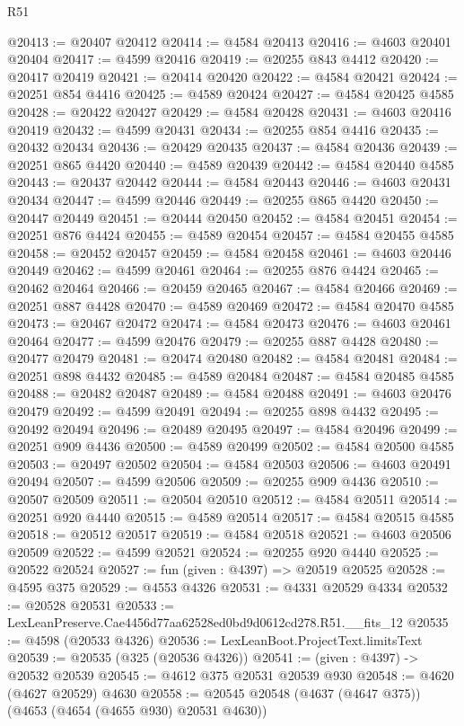 \begin{lexlean}{R51}
\begin{coremodule}
@20413 := @20407 @20412
@20414 := @4584 @20413
@20416 := @4603 @20401 @20404
@20417 := @4599 @20416
@20419 := @20255 @843 @4412
@20420 := @20417 @20419
@20421 := @20414 @20420
@20422 := @4584 @20421
@20424 := @20251 @854 @4416
@20425 := @4589 @20424
@20427 := @4584 @20425 @4585
@20428 := @20422 @20427
@20429 := @4584 @20428
@20431 := @4603 @20416 @20419
@20432 := @4599 @20431
@20434 := @20255 @854 @4416
@20435 := @20432 @20434
@20436 := @20429 @20435
@20437 := @4584 @20436
@20439 := @20251 @865 @4420
@20440 := @4589 @20439
@20442 := @4584 @20440 @4585
@20443 := @20437 @20442
@20444 := @4584 @20443
@20446 := @4603 @20431 @20434
@20447 := @4599 @20446
@20449 := @20255 @865 @4420
@20450 := @20447 @20449
@20451 := @20444 @20450
@20452 := @4584 @20451
@20454 := @20251 @876 @4424
@20455 := @4589 @20454
@20457 := @4584 @20455 @4585
@20458 := @20452 @20457
@20459 := @4584 @20458
@20461 := @4603 @20446 @20449
@20462 := @4599 @20461
@20464 := @20255 @876 @4424
@20465 := @20462 @20464
@20466 := @20459 @20465
@20467 := @4584 @20466
@20469 := @20251 @887 @4428
@20470 := @4589 @20469
@20472 := @4584 @20470 @4585
@20473 := @20467 @20472
@20474 := @4584 @20473
@20476 := @4603 @20461 @20464
@20477 := @4599 @20476
@20479 := @20255 @887 @4428
@20480 := @20477 @20479
@20481 := @20474 @20480
@20482 := @4584 @20481
@20484 := @20251 @898 @4432
@20485 := @4589 @20484
@20487 := @4584 @20485 @4585
@20488 := @20482 @20487
@20489 := @4584 @20488
@20491 := @4603 @20476 @20479
@20492 := @4599 @20491
@20494 := @20255 @898 @4432
@20495 := @20492 @20494
@20496 := @20489 @20495
@20497 := @4584 @20496
@20499 := @20251 @909 @4436
@20500 := @4589 @20499
@20502 := @4584 @20500 @4585
@20503 := @20497 @20502
@20504 := @4584 @20503
@20506 := @4603 @20491 @20494
@20507 := @4599 @20506
@20509 := @20255 @909 @4436
@20510 := @20507 @20509
@20511 := @20504 @20510
@20512 := @4584 @20511
@20514 := @20251 @920 @4440
@20515 := @4589 @20514
@20517 := @4584 @20515 @4585
@20518 := @20512 @20517
@20519 := @4584 @20518
@20521 := @4603 @20506 @20509
@20522 := @4599 @20521
@20524 := @20255 @920 @4440
@20525 := @20522 @20524
@20527 := fun (given : @4397) => @20519 @20525
@20528 := @4595 @375
@20529 := @4553 @4326
@20531 := @4331 @20529 @4334
@20532 := @20528 @20531
@20533 := LexLeanPreserve.Cae4456d77aa62528ed0bd9d0612cd278.R51.__fits_12
@20535 := @4598 (@20533 @4326)
@20536 := LexLeanBoot.ProjectText.limitsText
@20539 := @20535 (@325 (@20536 @4326))
@20541 := (given : @4397) -> @20532 @20539
@20545 := @4612 @375 @20531 @20539 @930
@20548 := @4620 (@4627 @20529) @4630
@20558 := @20545 @20548 (@4637 (@4647 @375)) (@4653 (@4654 (@4655 @930) @20531 @4630))

\end{coremodule}
\end{lexlean}
